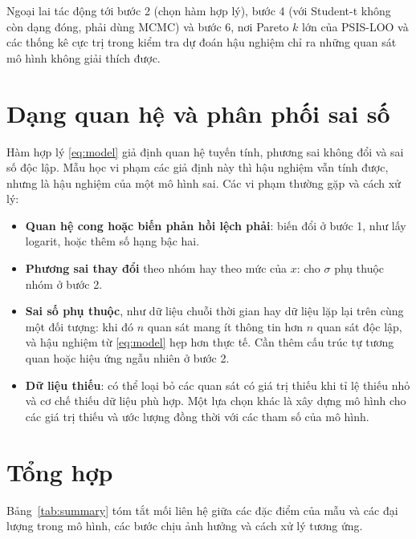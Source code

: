 \documentclass[12pt,a4paper]{report}
\begin{document}

Ngoại lai tác động tới bước 2 (chọn hàm hợp lý), bước 4 (với Student-t không còn
dạng đóng, phải dùng MCMC) và bước 6, nơi Pareto $k$ lớn của PSIS-LOO và các
thống kê cực trị trong kiểm tra dự đoán hậu nghiệm chỉ ra những quan sát mô hình
không giải thích được.

\section{Dạng quan hệ và phân phối sai số}
\label{sec:dep-shape}

Hàm hợp lý \eqref{eq:model} giả định quan hệ tuyến tính, phương sai không đổi và
sai số độc lập. Mẫu học vi phạm các giả định này thì hậu nghiệm vẫn tính được,
nhưng là hậu nghiệm của một mô hình sai. Các vi phạm thường gặp và cách xử lý:

\begin{itemize}
  \item \textbf{Quan hệ cong hoặc biến phản hồi lệch phải}: biến đổi ở bước 1, như
    lấy logarit, hoặc thêm số hạng bậc hai.
  \item \textbf{Phương sai thay đổi} theo nhóm hay theo mức của $x$: cho $\sigma$
    phụ thuộc nhóm ở bước 2.
  \item \textbf{Sai số phụ thuộc}, như dữ liệu chuỗi thời gian hay dữ liệu lặp lại
    trên cùng một đối tượng: khi đó $n$ quan sát mang ít thông tin hơn $n$ quan
    sát độc lập, và hậu nghiệm từ \eqref{eq:model} hẹp hơn thực tế. Cần thêm cấu
    trúc tự tương quan hoặc hiệu ứng ngẫu nhiên ở bước 2.
  \item \textbf{Dữ liệu thiếu}: có thể loại bỏ các quan sát có giá trị thiếu khi tỉ lệ thiếu
    nhỏ và cơ chế thiếu dữ liệu phù hợp. Một lựa chọn khác là xây dựng mô hình
    cho các giá trị thiếu và ước lượng đồng thời với các tham số của mô hình.
\end{itemize}

\section{Tổng hợp}

Bảng~\ref{tab:summary} tóm tắt mối liên hệ giữa các đặc điểm của mẫu và các đại
lượng trong mô hình, các bước chịu ảnh hưởng và cách xử lý tương ứng.
\end{document}

